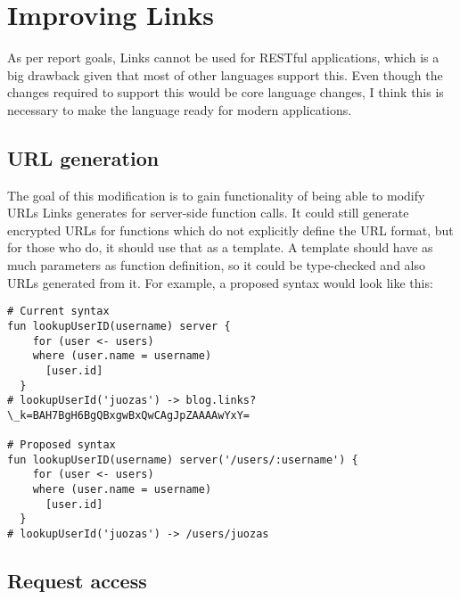 \section{Improving Links}

As per report goals, Links cannot be used for RESTful applications, which is a big drawback given that most of other languages support this. Even though the changes required to support this would be core language changes, I think this is necessary to make the language ready for modern applications. 

\subsection{URL generation}

The goal of this modification is to gain functionality of being able to modify URLs Links generates for server-side function calls. It could still generate encrypted URLs for functions which do not explicitly define the URL format, but for those who do, it should use that as a template. A template should have as much parameters as function definition, so it could be type-checked and also URLs generated from it. For example, a proposed syntax would look like this:

\begin{codelisting}
\begin{verbatim}
# Current syntax
fun lookupUserID(username) server {
    for (user <- users)
    where (user.name = username)
      [user.id]
  }
# lookupUserId('juozas') -> blog.links?\_k=BAH7BgH6BgQBxgwBxQwCAgJpZAAAAwYxY=

# Proposed syntax
fun lookupUserID(username) server('/users/:username') {
    for (user <- users)
    where (user.name = username)
      [user.id]
  }
# lookupUserId('juozas') -> /users/juozas
\end{verbatim}
\end{codelisting}

\subsection{Request access}
